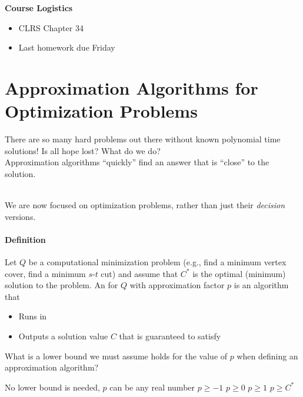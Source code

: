 \documentclass[11  pt]{article}
\begin{document}
	
	\textbf{Course Logistics}
	\begin{itemize}
		\item CLRS Chapter 34
		\item Last homework due Friday
	\end{itemize}


	
	\section{Approximation Algorithms for Optimization Problems}
	There are so many hard problems out there without known polynomial time solutions! Is all hope lost? What do we do?\\
	
	Approximation algorithms ``quickly'' find an answer that is ``close'' to the solution. \\ \\
	
	\vs{3cm} 
	
	We are now focused on optimization problems, rather than just their \emph{decision} versions.
	\paragraph{Definition}
	Let $Q$ be a computational minimization problem (e.g., find a minimum vertex cover, find a minimum $s$-$t$ cut) and assume that $C^*$ is the optimal (minimum) solution to the problem. An  for $Q$ with approximation factor $p$ is an algorithm that 
	\begin{itemize}
		\item Runs in %
		\item Outputs a solution value $C$ that is guaranteed to satisfy %
	\end{itemize}
	
	\vfill
	
	\begin{Qu}
		What is a lower bound we must assume holds for the value of $p$ when defining an approximation algorithm?
		\begin{itemize}
			\aitem No lower bound is needed, $p$ can be any real number
			\bitem $ p \geq -1$
			\citem $p \geq 0$
			\ditem $p \geq 1$
			\eitem $p \geq C^*$
		\end{itemize}
	\end{Qu}
	\vs{1cm}
	
\end{document}
